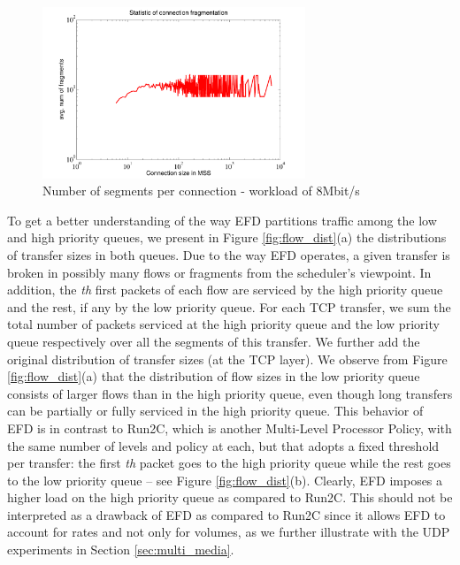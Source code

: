 \documentclass[preprint,12pt]{elsarticle}
\begin{document}
\begin{figure}[ht]
  \centering
  \includegraphics[width=0.7\textwidth]{./fig/wired/internal_dynamics/segment_8}
  \caption{Number of segments per connection - workload of 8Mbit/s}
  \label{fig:seg8}
\end{figure}


To get a better understanding of the way EFD partitions traffic among the low and high priority queues, we present in Figure \ref{fig:flow_dist}(a) the distributions of transfer sizes in both queues. Due to the way EFD operates, a given transfer is broken in possibly many flows or fragments from the scheduler's viewpoint. In addition, the \textit{th} first packets of each flow are serviced by the high priority queue and the rest, if any by the low priority queue. For each TCP transfer, we sum the total number of packets serviced at the high priority queue and the low priority queue respectively over all the segments of this transfer. We further add the original distribution of transfer sizes (at the TCP layer). We observe from  Figure \ref{fig:flow_dist}(a) that the distribution of flow sizes  in the low priority queue consists of larger flows than in the high priority queue, even though long transfers can be partially or fully serviced in the high priority queue. This behavior of EFD is in contrast to Run2C, which is another Multi-Level Processor Policy, with the same number of levels and policy at each, but that adopts a fixed threshold per transfer: the first \textit{th} packet goes to the high priority queue while the rest goes to the low priority queue -- see  Figure \ref{fig:flow_dist}(b). Clearly, EFD imposes a higher load on the high priority queue as compared to Run2C. This should not be interpreted as a drawback of EFD as compared to Run2C since it allows EFD to account for rates and not only for volumes, as we further illustrate with the UDP experiments in Section \ref{sec:multi_media}. 
\end{document}
